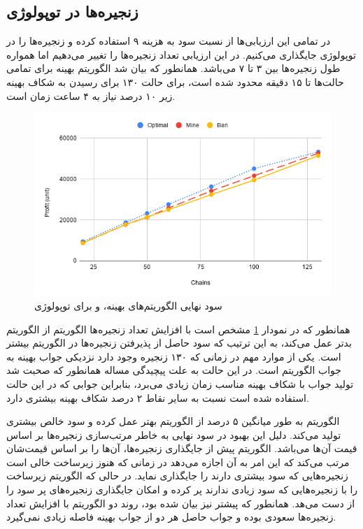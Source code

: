 \subsection{زنجیره‌ها در توپولوژی }

در تمامی این ارزیابی‌ها از نسبت سود به هزینه ۹ استفاده کرده و زنجیره‌ها را در توپولوژی  جایگذاری می‌کنیم.
در این ارزیابی تعداد زنجیره‌ها را تغییر می‌دهیم اما همواره طول زنجیره‌ها بین ۳ تا ۷ می‌باشد.
همانطور که بیان شد الگوریتم بهینه برای تمامی حالت‌ها تا ۱۵ دقیقه محدود شده است، برای حالت ۱۳۰ برای رسیدن به شکاف بهینه زیر ۱۰ درصد نیاز به ۴ ساعت زمان است.


\begin{figure}[h!]
\center\includegraphics[scale=.5]{images/chart-2}
\caption{سود نهایی الگوریتم‌های بهینه،  و  برای توپولوژی }
\label{fig.7}
\end{figure}

همانطور که در نمودار \ref{fig.7} مشخص است با افزایش تعداد زنجیره‌ها الگوریتم  از الگوریتم  بدتر عمل می‌کند،
به این ترتیب که سود حاصل از پذیرفتن زنجیره‌ها در الگوریتم  بیشتر است.
یکی از موارد مهم در زمانی که ۱۳۰ زنجیره وجود دارد نزدیکی جواب بهینه به جواب الگوریتم  است.
در این حالت به علت پیچیدگی مساله همانطور که صحبت شد تولید جواب با شکاف بهینه مناسب زمان زیادی می‌برد،
بنابراین جوابی که در این حالت استفاده شده است نسبت به سایر نقاط ۲ درصد شکاف بهینه بیشتری دارد.

الگوریتم  به طور میانگین ۵ درصد از الگوریتم 
بهتر عمل کرده و سود خالص بیشتری تولید می‌کند.
دلیل این بهبود در سود نهایی به خاطر مرتب‌سازی زنجیره‌ها بر اساس قیمت آن‌ها می‌باشد.
الگوریتم  پیش از جایگذاری زنجیره‌ها، آن‌ها را بر اساس قیمت‌شان مرتب می‌کند
که این امر به آن اجازه می‌دهد در زمانی که هنوز زیرساخت خالی است زنجیره‌هایی که سود بیشتری دارند را جایگذاری نماید.
در حالی که الگوریتم 
زیرساخت را با زنجیره‌هایی که سود زیادی ندارند پر کرده و امکان جایگذاری زنجیره‌های پر سود را از دست می‌هد.
همانطور که پیشتر نیز بیان شده بود، روند دو الگوریتم با افزایش تعداد زنجیره‌ها سعودی بوده و جواب حاصل هر دو از جواب بهینه فاصله
زیادی نمی‌گیرد.


